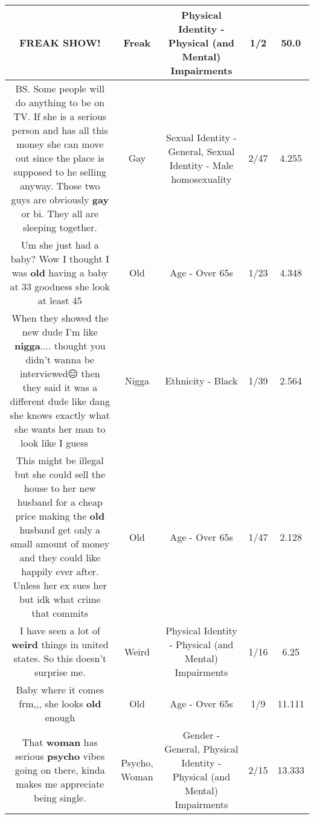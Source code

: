 \documentclass[11pt]{article}
\newlength\mylength
\begin{document}
\begin{center}
\begin{longtable}{|C{.65\mylength}|C{.30\mylength}|C{.12\mylength}|C{.12\mylength}|C{.12\mylength}|}
  \small FREAK SHOW!\normalsize   & Freak & Physical Identity - Physical (and Mental) Impairments & 1/2 & 50.0 \\  \hline
  \small BS. Some people will do anything to be on TV. If she is a serious person and has all this money she can move out since the place is supposed to he selling anyway. Those two guys are obviously \textbf{g\textbf{ay}} or bi. They all are sleeping together.\normalsize   & Gay & Sexual Identity - General, Sexual Identity - Male homosexuality & 2/47 & 4.255 \\  \hline
  \small Um she just had a baby? Wow I thought I was \textbf{old} having a baby at 33 goodness she look at least 45\normalsize   & Old & Age - Over 65s & 1/23 & 4.348 \\  \hline
  \small When they showed the new dude I'm like \textbf{nigga}.... thought you didn't wanna be interviewed😑 then they said it was a different dude like dang she knows exactly what she wants her man to look like I guess 🤣🤣🤣\normalsize   & Nigga & Ethnicity - Black & 1/39 & 2.564 \\  \hline
  \small This might be illegal but she could sell the house to her new husband for a cheap price making the \textbf{old} husband get only a small amount of money and they could like happily ever after.   Unless her ex sues her but idk what crime that commits\normalsize   & Old & Age - Over 65s & 1/47 & 2.128 \\  \hline
  \small I have seen a lot of \textbf{weird} things in united states. So this doesn't surprise me.\normalsize   & Weird & Physical Identity - Physical (and Mental) Impairments & 1/16 & 6.25 \\  \hline
  \small Baby where it comes frm,,, she looks \textbf{old} enough\normalsize   & Old & Age - Over 65s & 1/9 & 11.111 \\  \hline
  \small That \textbf{woman} has serious \textbf{psycho} vibes going on there, kinda makes me appreciate being single.\normalsize   & Psycho, Woman & Gender - General, Physical Identity - Physical (and Mental) Impairments & 2/15 & 13.333 \\  \hline

\end{longtable}
\end{center}
\end{document}
